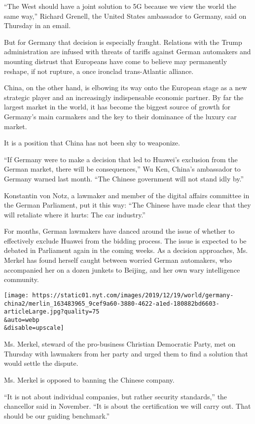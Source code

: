``The West should have a joint solution to 5G because we view the world
the same way,'' Richard Grenell, the United States ambassador to
Germany, said on Thursday in an email.

But for Germany that decision is especially fraught. Relations with the
Trump administration are infused with threats of tariffs against German
automakers and mounting distrust that Europeans have come to believe may
permanently reshape, if not rupture, a once ironclad trans-Atlantic
alliance.

China, on the other hand, is elbowing its way onto the European stage as
a new strategic player and an increasingly indispensable economic
partner. By far the largest market in the world, it has become the
biggest source of growth for Germany's main carmakers and the key to
their dominance of the luxury car market.

It is a position that China has not been shy to weaponize.

``If Germany were to make a decision that led to Huawei's exclusion from
the German market, there will be consequences,'' Wu Ken, China's
ambassador to Germany warned last month. ``The Chinese government will
not stand idly by.''

Konstantin von Notz, a lawmaker and member of the digital affairs
committee in the German Parliament, put it this way: ``The Chinese have
made clear that they will retaliate where it hurts: The car industry.''

For months, German lawmakers have danced around the issue of whether to
effectively exclude Huawei from the bidding process. The issue is
expected to be debated in Parliament again in the coming weeks. As a
decision approaches, Ms. Merkel has found herself caught between worried
German automakers, who accompanied her on a dozen junkets to Beijing,
and her own wary intelligence community.

\texttt{[image: https://static01.nyt.com/images/2019/12/19/world/germany-china2/merlin\_163483965\_9cef9a60-3880-4622-a1ed-180882bd6603-articleLarge.jpg?quality=75\\\&auto=webp\\\&disable=upscale]}

Ms. Merkel, steward of the pro-business Christian Democratic Party, met
on Thursday with lawmakers from her party and urged them to find a
solution that would settle the dispute.

Ms. Merkel is opposed to banning the Chinese company.

``It is not about individual companies, but rather security standards,''
the chancellor said in November. ``It is about the certification we will
carry out. That should be our guiding benchmark.''

